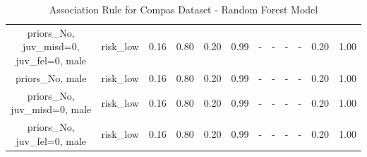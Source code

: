 \begin{table}[H]
{\begin{tabular}{|c|c|c|c|c|c|c|c|c|c|c|c|}
priors\_No, juv\_misd=0, juv\_fel=0, male & risk\_low & 0.16 & 0.80 & 0.20 & 0.99 & - & - & - & - & 0.20 & 1.00 \\
priors\_No, male & risk\_low & 0.16 & 0.80 & 0.20 & 0.99 & - & - & - & - & 0.20 & 1.00 \\
priors\_No, juv\_misd=0, male & risk\_low & 0.16 & 0.80 & 0.20 & 0.99 & - & - & - & - & 0.20 & 1.00 \\
priors\_No, juv\_fel=0, male & risk\_low & 0.16 & 0.80 & 0.20 & 0.99 & - & - & - & - & 0.20 & 1.00 \\
        \hline
        \end{tabular}
        }
        \\[10pt]
        \caption{Association Rule for Compas Dataset - Random Forest Model}
        \label{table:asso_rules_compas_Random Forest}
        \end{table}
        